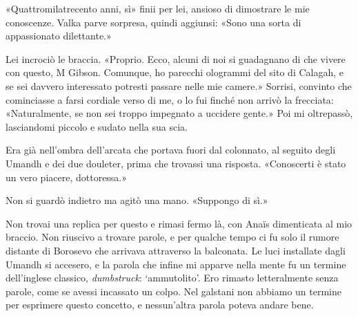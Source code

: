«Quattromilatrecento anni, sì» finii per lei, ansioso di dimostrare le
mie conoscenze. Valka parve sorpresa, quindi aggiunsi: «Sono una sorta
di appassionato dilettante.»

Lei incrociò le braccia. «Proprio. Ecco, alcuni di noi si guadagnano di
che vivere con questo, M Gibson. Comunque, ho parecchi ologrammi del
sito di Calagah, e se sei davvero interessato potresti passare nelle mie
camere.» Sorrisi, convinto che cominciasse a farsi cordiale verso di me,
o lo fui finché non arrivò la frecciata: «Naturalmente, se non sei
troppo impegnato a uccidere gente.» Poi mi oltrepassò, lasciandomi
piccolo e sudato nella sua scia.

Era già nell'ombra dell'arcata che portava fuori dal colonnato, al
seguito degli Umandh e dei due douleter, prima che trovassi una
risposta. «Conoscerti è stato un vero piacere, dottoressa.»

Non si guardò indietro ma agitò una mano. «Suppongo di sì.»

Non trovai una replica per questo e rimasi fermo là, con Anaïs
dimenticata al mio braccio. Non riuscivo a trovare parole, e per qualche
tempo ci fu solo il rumore distante di Borosevo che arrivava attraverso
la balconata. Le luci installate dagli Umandh si accesero, e la parola
che infine mi apparve nella mente fu un termine dell'inglese classico,
\emph{dumbstruck}: `ammutolito'. Ero rimasto letteralmente senza parole,
come se avessi incassato un colpo. Nel galstani non abbiamo un termine
per esprimere questo concetto, e nessun'altra parola poteva andare bene.


